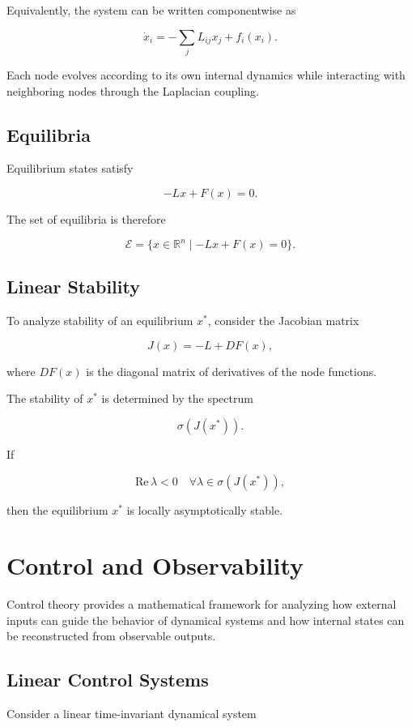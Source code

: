 \documentclass[12pt]{article}
\begin{document}
Equivalently, the system can be written componentwise as

\[
\dot{x}_i = -\sum_j L_{ij}x_j + f_i(x_i).
\]

Each node evolves according to its own internal dynamics while interacting with neighboring nodes through the Laplacian coupling.

\subsection{Equilibria}

Equilibrium states satisfy

\[
-Lx + F(x)=0.
\]

The set of equilibria is therefore

\[
\mathcal{E} = \{x \in \mathbb{R}^n \mid -Lx + F(x)=0\}.
\]

\subsection{Linear Stability}

To analyze stability of an equilibrium $x^*$, consider the Jacobian matrix

\[
J(x)= -L + DF(x),
\]

where $DF(x)$ is the diagonal matrix of derivatives of the node functions.

The stability of $x^*$ is determined by the spectrum

\[
\sigma(J(x^*)).
\]

If

\[
\mathrm{Re}\,\lambda < 0
\quad
\forall \lambda \in \sigma(J(x^*)),
\]

then the equilibrium $x^*$ is locally asymptotically stable.

\section{Control and Observability}

Control theory provides a mathematical framework for analyzing how external inputs can guide the behavior of dynamical systems and how internal states can be reconstructed from observable outputs.

\subsection{Linear Control Systems}

Consider a linear time-invariant dynamical system
\end{document}
